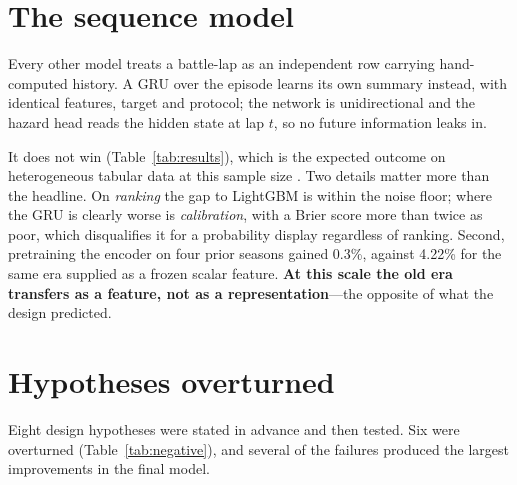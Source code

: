 \documentclass[11pt,a4paper]{article}
\begin{document}
\section{The sequence model}
\label{sec:sequence}

Every other model treats a battle-lap as an independent row carrying
hand-computed history. A GRU \citep{cho2014gru} over the episode learns its own
summary instead, with identical features, target and protocol; the network is
unidirectional and the hazard head reads the hidden state at lap $t$, so no
future information leaks in.

It does not win (Table~\ref{tab:results}), which is the expected outcome on
heterogeneous tabular data at this sample size
\citep{grinsztajn2022tabular,shwartzziv2022tabular}. Two details matter more than
the headline. On \emph{ranking} the gap to LightGBM is within the noise floor;
where the GRU is clearly worse is \emph{calibration}, with a Brier score more than
twice as poor, which disqualifies it for a probability display regardless of
ranking. Second, pretraining the encoder on four prior seasons gained
0.3\%, against 4.22\% for the same era supplied as a
frozen scalar feature. \textbf{At this scale the old era transfers as a feature,
not as a representation}---the opposite of what the design predicted.

\section{Hypotheses overturned}
\label{sec:negative}

Eight design hypotheses were stated in advance and then tested. Six were
overturned (Table~\ref{tab:negative}), and several of the failures produced the
largest improvements in the final model.
\end{document}
